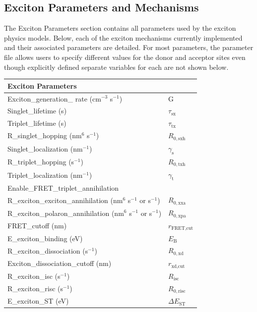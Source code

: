 \documentclass[%
 reprint,onecolumn,notitlepage,
superscriptaddress,longbibliography,
 amsmath,amssymb,
 aps,rmp,floatfix,
]{revtex4-1}
\begin{document}
\subsection{Exciton Parameters and Mechanisms}

The Exciton Parameters section contains all parameters used by the exciton physics models. Below, each of the exciton mechanisms currently implemented and their associated parameters are detailed.
For most parameters, the parameter file allows users to specify different values for the donor and acceptor sites even though explicitly defined separate variables for each are not shown below.

\begin{center}
\begin{tabular}{ l l }
\hline
Exciton Parameters & \\
 \hline
Exciton\_generation\_ rate (cm$^{-3}$ s$^{-1}$) & G \\
Singlet\_lifetime (s) & $\tau_\text{sx}$  \\
Triplet\_lifetime (s) & $\tau_\text{tx}$ \\
R\_singlet\_hopping (nm$^6$ s$^{-1}$) & $R_{0,\text{sxh}}$ \\
Singlet\_localization (nm$^{-1}$) & $\gamma_\text{s}$ \\
R\_triplet\_hopping (s$^{-1}$) & $R_{0,\text{txh}}$ \\
Triplet\_localization (nm$^{-1}$) & $\gamma_\text{t}$ \\
Enable\_FRET\_triplet\_annihilation & \\
R\_exciton\_exciton\_annihilation (nm$^{6}$ s$^{-1}$ or s$^{-1}$) & $R_{0,\text{xxa}}$\\
R\_exciton\_polaron\_annihilation (nm$^{6}$ s$^{-1}$ or s$^{-1}$) & $R_{0,\text{xpa}}$ \\ 
FRET\_cutoff (nm) & $r_{\text{FRET,cut}}$ \\
E\_exciton\_binding (eV) & $E_\text{B}$ \\
R\_exciton\_dissociation (s$^{-1}$) & $R_{0,\text{xd}}$ \\
Exciton\_dissociation\_cutoff (nm) & $r_{\text{xd,cut}}$ \\
R\_exciton\_isc (s$^{-1}$) & $R_{\text{isc}}$ \\
R\_exciton\_risc (s$^{-1}$) & $R_{0,\text{risc}}$ \\
E\_exciton\_ST (eV) & $\Delta E_\text{ST}$ \\
\end{tabular}
\end{center}
\end{document}
